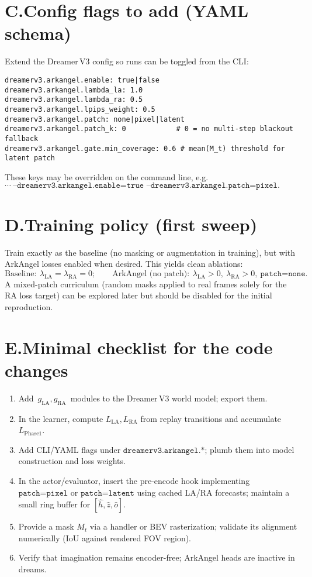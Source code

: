 \documentclass[11pt]{article}
\begin{document}
\section*{C.\quad Config flags to add (YAML schema)}
Extend the Dreamer\,V3 config so runs can be toggled from the CLI:
\begin{verbatim}
dreamerv3.arkangel.enable: true|false
dreamerv3.arkangel.lambda_la: 1.0
dreamerv3.arkangel.lambda_ra: 0.5
dreamerv3.arkangel.lpips_weight: 0.5
dreamerv3.arkangel.patch: none|pixel|latent
dreamerv3.arkangel.patch_k: 0            # 0 = no multi-step blackout fallback
dreamerv3.arkangel.gate.min_coverage: 0.6 # mean(M_t) threshold for latent patch
\end{verbatim}
These keys may be overridden on the command line, e.g.
\(
\cdots\ \texttt{--dreamerv3.arkangel.enable=true\ --dreamerv3.arkangel.patch=pixel}.
\)

\section*{D.\quad Training policy (first sweep)}
Train exactly as the baseline (no masking or augmentation in training), but with ArkAngel losses enabled when desired. This yields clean ablations:
\[
\text{Baseline}:\ \lambda_{\mathrm{LA}}=\lambda_{\mathrm{RA}}=0;\qquad
\text{ArkAngel (no patch)}:\ \lambda_{\mathrm{LA}}>0,\ \lambda_{\mathrm{RA}}>0,\ \texttt{patch=none}.
\]
A mixed-patch curriculum (random masks applied to real frames solely for the RA loss target) can be explored later but should be disabled for the initial reproduction.

\section*{E.\quad Minimal checklist for the code changes}
\begin{enumerate}
\item Add \(\,g_{\mathrm{LA}},g_{\mathrm{RA}}\,\) modules to the Dreamer\,V3 world model; export them.
\item In the learner, compute \(L_{\mathrm{LA}},L_{\mathrm{RA}}\) from replay transitions and accumulate \(L_{\mathrm{Phase1}}\).
\item Add CLI/YAML flags under \(\texttt{dreamerv3.arkangel.*}\); plumb them into model construction and loss weights.
\item In the actor/evaluator, insert the pre-encode hook implementing \(\texttt{patch=pixel}\) or \(\texttt{patch=latent}\) using cached LA/RA forecasts; maintain a small ring buffer for \([\hat h,\hat z,\hat o]\).
\item Provide a mask \(M_t\) via a handler or BEV rasterization; validate its alignment numerically (IoU against rendered FOV region).
\item Verify that imagination remains encoder-free; ArkAngel heads are inactive in dreams.
\end{enumerate}
\end{document}

